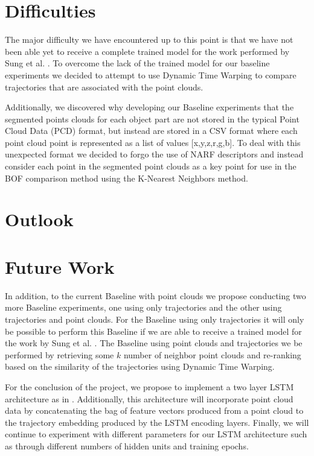 \documentclass[letterpaper, 12 pt, conference]{ieeeconf}
\begin{document}
\section{Difficulties}

The major difficulty we have encountered up to this point is that we have not been able yet to receive a complete trained model for the work performed by Sung et al. \cite{sung2016robobarista}. To overcome the lack of the trained model for our baseline experiments we decided to attempt to use Dynamic Time Warping to compare trajectories that are associated with the point clouds. 

Additionally, we discovered why developing our Baseline experiments that the segmented points clouds for each object part are not stored in the typical Point Cloud Data (PCD) format, but instead are stored in a CSV format where each point cloud point is represented as a list of values [x,y,z,r,g,b]. To deal with this unexpected format we decided to forgo the use of NARF \cite{steder2010narf} descriptors and instead consider each point in the segmented point clouds as a key point for use in the BOF comparison method using the K-Nearest Neighbors method. 



\section{Outlook}

\section{Future Work}

In addition, to the current Baseline with point clouds we propose conducting two more Baseline experiments, one using only trajectories and the other using trajectories and point clouds. For the Baseline using only trajectories it will only be possible to perform this Baseline if we are able to receive a trained model for the work by Sung et al. \cite{sung2016robobarista}. The Baseline using point clouds and trajectories we be performed by retrieving some $k$ number of neighbor point clouds and re-ranking based on the similarity of the trajectories using Dynamic Time Warping.

For the conclusion of the project, we propose to implement a two layer LSTM architecture as in \cite{Venugopalan_2015_ICCV}. Additionally, this architecture will incorporate point cloud data by concatenating the bag of feature vectors produced from a point cloud to the trajectory embedding produced by the LSTM encoding layers. Finally, we will continue to experiment with different parameters for our LSTM architecture such as through different numbers of hidden units and training epochs. 
\end{document}
